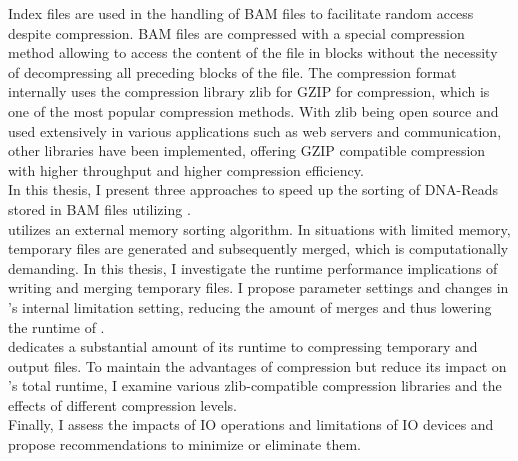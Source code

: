 Index files are used in the handling of BAM files to facilitate random access despite compression. BAM files are compressed with a special compression method allowing to access the content of the file in blocks without the necessity of decompressing all preceding blocks of the file. The compression format internally uses the compression library zlib for GZIP for compression, which is one of the most popular compression methods. With zlib being open source and used extensively in various applications such as web servers and communication, other libraries have been implemented, offering GZIP compatible compression with higher throughput and higher compression efficiency. \\

In this thesis, I present three approaches to speed up the sorting of DNA-Reads stored in BAM files utilizing \sort. \\

\sort utilizes an external memory sorting algorithm. In situations with limited memory, temporary files are generated and subsequently merged, which is computationally demanding. In this thesis, I investigate the runtime performance implications of \sort writing and merging temporary files. I propose parameter settings and changes in \sort's internal limitation setting, reducing the amount of merges and thus lowering the runtime of \sort. \\

\sort dedicates a substantial amount of its runtime to compressing temporary and output files. To maintain the advantages of compression but reduce its impact on \sort's total runtime, I examine various zlib-compatible compression libraries and the effects of different compression levels. \\

Finally, I assess the impacts of IO operations and limitations of IO devices and propose recommendations to minimize or eliminate them.
